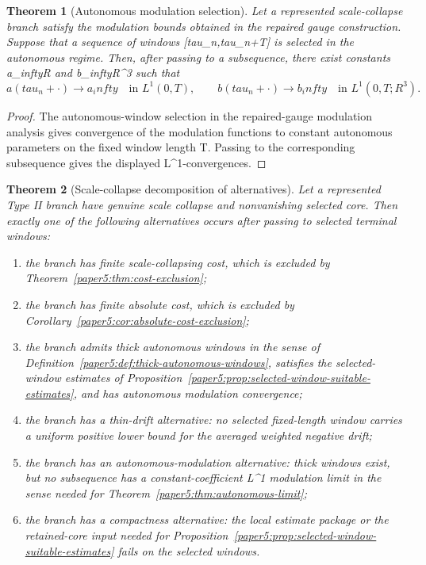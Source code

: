 \documentclass[11pt]{amsart}
\def\({}%
\def\){}%
\def\mathbb#1{#1}%
\def\tau{tau}%
\def\infty{infty}%
\theoremstyle{plain}
\newtheorem{theorem}{Theorem}[section]
\theoremstyle{definition}
\theoremstyle{remark}
\begin{document}
\begin{theorem}[Autonomous modulation selection]\label{paper5:thm:autonomous-modulation-selection}
Let a represented scale-collapse branch satisfy the modulation bounds obtained in the repaired
gauge construction.  Suppose that a sequence of windows \([\tau_n,\tau_n+T]\) is selected in the
autonomous regime.  Then, after passing to a subsequence, there exist constants
\(a_\infty\in\mathbb R\) and \(b_\infty\in\mathbb R^3\) such that
\[
  a(\tau_n+\cdot)\to a_\infty
  \quad\text{in }L^1(0,T),
  \qquad
  b(\tau_n+\cdot)\to b_\infty
  \quad\text{in }L^1(0,T;\mathbb R^3).
\]
\end{theorem}

\begin{proof}
The autonomous-window selection in the repaired-gauge modulation analysis gives convergence
of the modulation functions to constant autonomous parameters on the fixed window length
\(T\).  Passing to the corresponding subsequence gives the displayed
\(L^1\)-convergences.
\end{proof}

\begin{theorem}[Scale-collapse decomposition of alternatives]\label{paper5:thm:scale-collapse-stratification}
Let a represented Type II branch have genuine scale collapse and nonvanishing selected core.
Then exactly one of the following alternatives occurs after passing to selected terminal
windows:
\begin{enumerate}[label=(\roman*)]
  \item the branch has finite scale-collapsing cost, which is excluded by
  Theorem~\ref{paper5:thm:cost-exclusion};
  \item the branch has finite absolute cost, which is excluded by
  Corollary~\ref{paper5:cor:absolute-cost-exclusion};
  \item the branch admits thick autonomous windows in the sense of
  Definition~\ref{paper5:def:thick-autonomous-windows}, satisfies the selected-window estimates of
  Proposition~\ref{paper5:prop:selected-window-suitable-estimates}, and has autonomous modulation convergence;
  \item the branch has a thin-drift alternative: no selected fixed-length window carries a uniform
  positive lower bound for the averaged weighted negative drift;
  \item the branch has an autonomous-modulation alternative: thick windows exist, but no subsequence
  has a constant-coefficient \(L^1\) modulation limit in the sense needed for
  Theorem~\ref{paper5:thm:autonomous-limit};
  \item the branch has a compactness alternative: the local estimate package or the
  retained-core input needed for
  Proposition~\ref{paper5:prop:selected-window-suitable-estimates} fails on the selected windows.
\end{enumerate}
\end{theorem}
\end{document}
